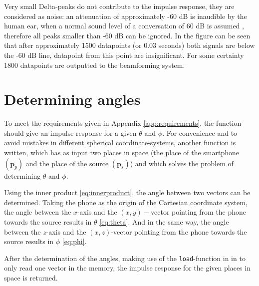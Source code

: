 Very small Delta-peaks do not contribute to the impulse response, they are considered as noise: an attenuation of approximately -60 dB is inaudible by the human ear, when a normal sound level of a conversation of 60 dB is assumed \cite{hospital}, therefore all peaks smaller than -60 dB can be ignored.
In the figure can be seen that after approximately 1500 datapoints (or 0.03 seconds) both signals are below the -60 dB line, datapoint from this point are insignificant. 
For some certainty 1800 datapoints are outputted to the beamforming system.

\section{Determining angles}
To meet the requirements given in Appendix \ref{app:requirements}, the function should give an impulse response for a given $\theta$ and $\phi$.
For convenience and to avoid mistakes in different spherical coordinate-systems, another function is written, which has as input two places in space (the place of the smartphone $(\mathbf{p}_p)$ and the place of the source $(\mathbf{p}_s)$) and which solves the problem of determining $\theta$ and $\phi$.

Using the inner product \cite[p.~21]{book:poole} \eqref{eq:innerproduct}, the angle between two vectors can be determined.
Taking the phone as the origin of the Cartesian coordinate system, the angle between the $x$-axis and the $(x,y)-$vector pointing from the phone towards the source results in $\theta$ \eqref{eq:theta}.
And in the same way, the angle between the $z$-axis and the $(x,z)$-vector pointing from the phone towards the source results in $\phi$ \eqref{eq:phi}.

After the determination of the angles, making use of the \texttt{load}-function in in {\matlab} to only read one vector in the memory, the impulse response for the given places in space is returned.

